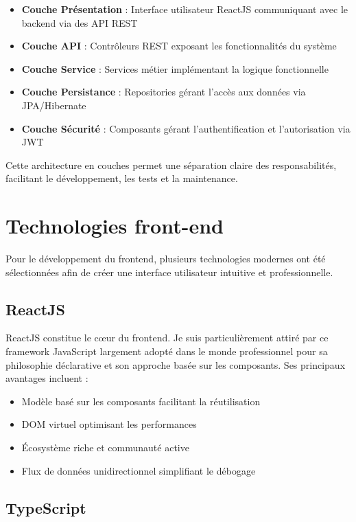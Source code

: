 \documentclass[12pt,a4paper]{report}
\begin{document}
\begin{itemize}
  \item \textbf{Couche Présentation} : Interface utilisateur ReactJS communiquant avec le backend via des API REST
  \item \textbf{Couche API} : Contrôleurs REST exposant les fonctionnalités du système
  \item \textbf{Couche Service} : Services métier implémentant la logique fonctionnelle
  \item \textbf{Couche Persistance} : Repositories gérant l'accès aux données via JPA/Hibernate
  \item \textbf{Couche Sécurité} : Composants gérant l'authentification et l'autorisation via JWT
\end{itemize}

Cette architecture en couches permet une séparation claire des responsabilités, facilitant le développement, les tests et la maintenance.

\section{Technologies front-end}

Pour le développement du frontend, plusieurs technologies modernes ont été sélectionnées afin de créer une interface utilisateur intuitive et professionnelle.

\subsection{ReactJS}

ReactJS constitue le cœur du frontend. Je suis particulièrement attiré par ce framework JavaScript largement adopté dans le monde professionnel pour sa philosophie déclarative et son approche basée sur les composants. Ses principaux avantages incluent :

\begin{itemize}
  \item Modèle basé sur les composants facilitant la réutilisation
  \item DOM virtuel optimisant les performances
  \item Écosystème riche et communauté active
  \item Flux de données unidirectionnel simplifiant le débogage
\end{itemize}

\subsection{TypeScript}
\end{document}
